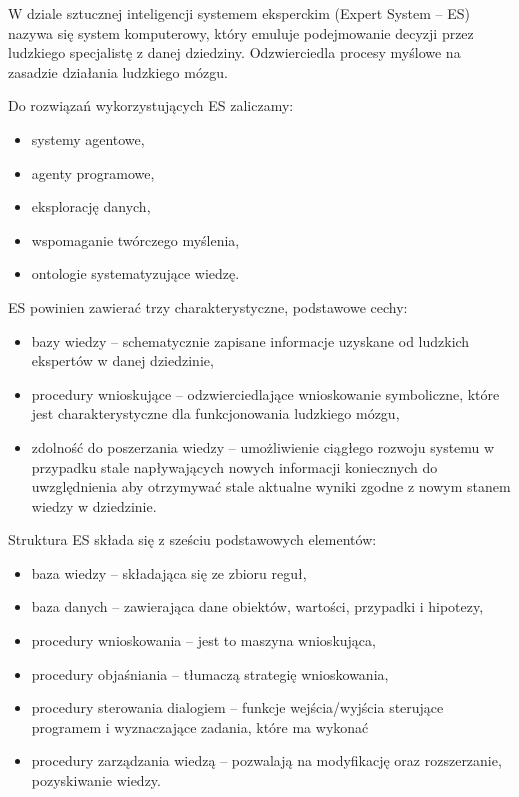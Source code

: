 \documentclass[12pt,a4paper]{article}
\begin{document}
	W dziale sztucznej inteligencji systemem eksperckim (Expert System -- ES) nazywa się system komputerowy, który emuluje podejmowanie decyzji przez ludzkiego specjalistę z danej dziedziny. Odzwierciedla procesy myślowe na zasadzie działania ludzkiego mózgu.
	
	Do rozwiązań wykorzystujących ES zaliczamy:
	\begin{itemize}
		\item systemy agentowe,
		\item agenty programowe,
		\item eksplorację danych,
		\item wspomaganie twórczego myślenia,
		\item ontologie systematyzujące wiedzę.
	\end{itemize}
	\bigskip
	
	ES powinien zawierać trzy charakterystyczne, podstawowe cechy:
	\begin{itemize}
		\item bazy wiedzy -- schematycznie zapisane informacje uzyskane od ludzkich ekspertów w danej dziedzinie,
		\item procedury wnioskujące -- odzwierciedlające wnioskowanie symboliczne, które jest charakterystyczne dla funkcjonowania ludzkiego mózgu,
		\item zdolność do poszerzania wiedzy -- umożliwienie ciągłego rozwoju systemu w przypadku stale napływających nowych informacji koniecznych do uwzględnienia aby otrzymywać stale aktualne wyniki zgodne z nowym stanem wiedzy w dziedzinie.
	\end{itemize}
	\bigskip
	
	Struktura ES składa się z sześciu podstawowych elementów:
	\begin{itemize}
		\item baza wiedzy -- składająca się ze zbioru reguł,
		\item baza danych -- zawierająca dane obiektów, wartości, przypadki i hipotezy,
		\item procedury wnioskowania -- jest to maszyna wnioskująca,
		\item procedury objaśniania -- tłumaczą strategię wnioskowania,
		\item procedury sterowania dialogiem -- funkcje wejścia/wyjścia sterujące programem i wyznaczające zadania, które ma wykonać
		\item procedury zarządzania wiedzą -- pozwalają na modyfikację oraz rozszerzanie, pozyskiwanie wiedzy.
	\end{itemize}
	
\end{document}
